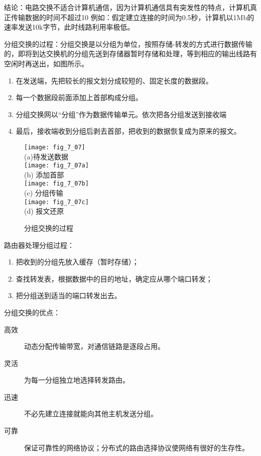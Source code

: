 结论：电路交换不适合计算机通信，因为计算机通信具有突发性的特点，计算机真正传输数据的时间不超过10%
例如：假定建立连接的时间为0.5秒，计算机以1Mb的速率发送10k字节，此时线路利用率极低。

分组交换的过程：分组交换是以分组为单位，按照存储-转发的方式进行数据传输的，即将到达交换机的分组先送到存储器暂时存储和处理，等到相应的输出线路有空闲时再送出，如图所示。

\begin{enumerate}
  \item 在发送端，先把较长的报文划分成较短的、固定长度的数据段。
  \item 每一个数据段前面添加上首部构成分组。
  \item 分组交换网以“分组”作为数据传输单元。依次把各分组发送到接收端
\item 最后，接收端收到分组后剥去首部，把收到的数据恢复成为原来的报文。

\end{enumerate}


\begin{figure}
  \centering
  \texttt{[image: fig\_7\_07]}\\(a)待发送数据\\
  \texttt{[image: fig\_7\_07a]}\\(b) 添加首部\\
  \texttt{[image: fig\_7\_07b]}\\(c) 分组传输\\
  \texttt{[image: fig\_7\_07c]}\\(d) 报文还原\\
  \caption{分组交换的过程 }\label{fig_7_07}
\end{figure}


路由器处理分组过程：
\begin{enumerate}
  \item 把收到的分组先放入缓存（暂时存储）；

  \item 查找转发表，根据数据中的目的地址，确定应从哪个端口转发；

  \item 把分组送到适当的端口转发出去。

\end{enumerate}

分组交换的优点：

\begin{description}
  \item[高效] 动态分配传输带宽，对通信链路是逐段占用。

  \item[灵活] 为每一分组独立地选择转发路由。

  \item[迅速] 不必先建立连接就能向其他主机发送分组。

  \item[可靠] 保证可靠性的网络协议；分布式的路由选择协议使网络有很好的生存性。

\end{description}

